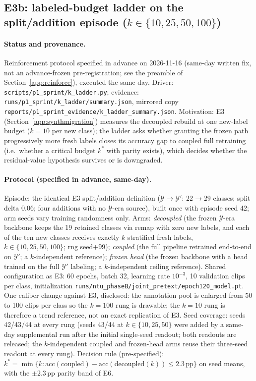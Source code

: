 \documentclass[11pt,a4paper]{article}
\begin{document}
\subsection{E3b: labeled-budget ladder on the split/addition episode ($k\in\{10,25,50,100\}$)}\label{app:kladder}

\paragraph{Status and provenance.}
Reinforcement protocol specified in advance on 2026-11-16 (same-day written fix, not an advance-frozen pre-registration; see the preamble of Section~\ref{app:reinforce}), executed the same day. Driver: \texttt{scripts/p1\_sprint/k\_ladder.py}; evidence: \texttt{runs/p1\_sprint/k\_ladder/summary.json}, mirrored copy \texttt{reports/p1\_sprint\_evidence/k\_ladder\_summary.json}. Motivation: E3 (Section~\ref{app:synthmigration}) measures the decoupled rebuild at one new-label budget ($k{=}10$ per new class); the ladder asks whether granting the frozen path progressively more fresh labels closes its accuracy gap to coupled full retraining (i.e.\ whether a critical budget $k^{\ast}$ with parity exists), which decides whether the residual-value hypothesis survives or is downgraded.

\paragraph{Protocol (specified in advance, same-day).}
Episode: the identical E3 split/addition definition ($\mathcal{Y}\to\mathcal{Y}'$: $22\to29$ classes; split delta 0.06; four additions with no $\mathcal{Y}$-era source), built once with episode seed 42; arm seeds vary training randomness only. Arms: \emph{decoupled} (the frozen $\mathcal{Y}$-era backbone keeps the 19 retained classes via remap with zero new labels, and each of the ten new classes receives exactly $k$ stratified fresh labels, $k\in\{10,25,50,100\}$; rng seed$+99$); \emph{coupled} (the full pipeline retrained end-to-end on $\mathcal{Y}'$; a $k$-independent reference); \emph{frozen head} (the frozen backbone with a head trained on the full $\mathcal{Y}'$ labeling; a $k$-independent ceiling reference). Shared configuration as E3: 60 epochs, batch 32, learning rate $10^{-3}$, 10 validation clips per class, initialization \texttt{runs/ntu\_phaseB/joint\_pretext/epoch120\_model.pt}. One caliber change against E3, disclosed: the annotation pool is enlarged from 50 to 100 clips per class so the $k{=}100$ rung is drawable; the $k{=}10$ rung is therefore a trend reference, not an exact replication of E3. Seed coverage: seeds 42/43/44 at every rung (seeds 43/44 at $k\in\{10,25,50\}$ were added by a same-day supplemental run after the initial single-seed readout; both readouts are released; the $k$-independent coupled and frozen-head arms reuse their three-seed readout at every rung). Decision rule (pre-specified): $k^{\ast}=\min\{k : \mathrm{acc}(\text{coupled})-\mathrm{acc}(\text{decoupled}(k))\leq 2.3\,\mathrm{pp}\}$ on seed means, with the $\pm2.3$\,pp parity band of E6.
\end{document}
